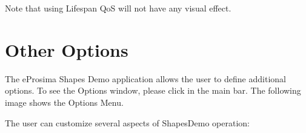 \documentclass[letterpaper,10pt,english]{sphinxmanual}
\begin{document}
Note that using Lifespan QoS will not have any visual effect.


\section{Other Options}
\label{\detokenize{firststept:other-options}}
The eProsima Shapes Demo application allows the user to define additional options. To see the Options window, please click  in the main bar. The following image shows the Options Menu.


The user can customize several aspects of ShapesDemo operation:
\end{document}
